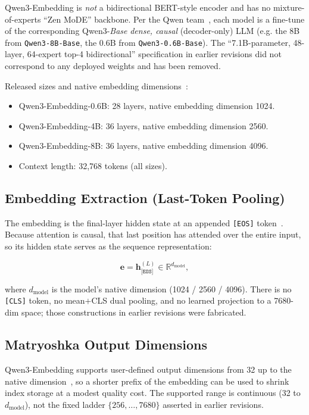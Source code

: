 \documentclass[11pt,a4paper]{article}
\begin{document}
Qwen3-Embedding is \emph{not} a bidirectional BERT-style encoder and has no
mixture-of-experts ``Zen MoDE'' backbone. Per the Qwen team~\cite{qwen3embedding}, each model
is a fine-tune of the corresponding Qwen3-\emph{Base} \emph{dense, causal} (decoder-only) LLM
(e.g. the 8B from \texttt{Qwen3-8B-Base}, the 0.6B from \texttt{Qwen3-0.6B-Base}). The
``7.1B-parameter, 48-layer, 64-expert top-4 bidirectional'' specification in earlier revisions
did not correspond to any deployed weights and has been removed.

Released sizes and native embedding dimensions~\cite{qwen3embedding}:
\begin{itemize}
\item Qwen3-Embedding-0.6B: 28 layers, native embedding dimension 1024.
\item Qwen3-Embedding-4B: 36 layers, native embedding dimension 2560.
\item Qwen3-Embedding-8B: 36 layers, native embedding dimension 4096.
\item Context length: 32,768 tokens (all sizes).
\end{itemize}

\subsection{Embedding Extraction (Last-Token Pooling)}

The embedding is the final-layer hidden state at an appended \texttt{[EOS]}
token~\cite{qwen3embedding}. Because attention is causal, that last position has attended over
the entire input, so its hidden state serves as the sequence representation:

\begin{equation}
\mathbf{e} = \mathbf{h}^{(L)}_{\texttt{[EOS]}} \in \mathbb{R}^{d_{\text{model}}},
\end{equation}

where $d_{\text{model}}$ is the model's native dimension (1024 / 2560 / 4096). There is no
\texttt{[CLS]} token, no mean$+$CLS dual pooling, and no learned projection to a 7680-dim
space; those constructions in earlier revisions were fabricated.

\subsection{Matryoshka Output Dimensions}

Qwen3-Embedding supports user-defined output dimensions from 32 up to the native
dimension~\cite{qwen3embedding,mrl}, so a shorter prefix of the embedding can be used to
shrink index storage at a modest quality cost. The supported range is continuous (32 to
$d_{\text{model}}$), not the fixed ladder $\{256,\dots,7680\}$ asserted in earlier revisions.
\end{document}
